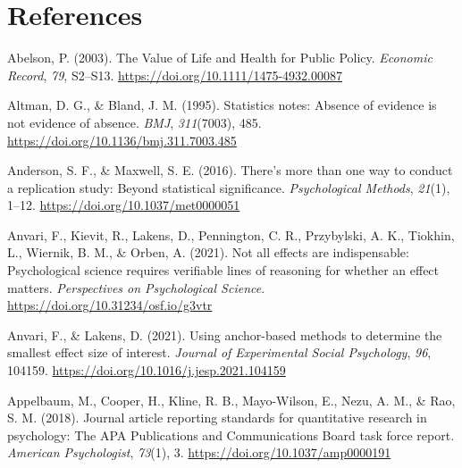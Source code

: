 \documentclass[
  letterpaper,
  DIV=11,
  numbers=noendperiod]{scrreprt}
\newlength{\cslhangindent}
\newlength{\cslentryspacingunit} %
\newenvironment{CSLReferences}[2] %
 {%
  \setlength{\parindent}{0pt}
  \ifodd #1
  \let\oldpar\par
  \def\par{\hangindent=\cslhangindent\oldpar}
  \fi
  \setlength{\parskip}{#2\cslentryspacingunit}
 }%
 {}
\begin{document}

\hypertarget{references}{%
\chapter*{References}\label{references}}


\hypertarget{refs}{}
\begin{CSLReferences}{1}{0}
\leavevmode{}%
Abelson, P. (2003). The {Value} of {Life} and {Health} for {Public
Policy}. \emph{Economic Record}, \emph{79}, S2--S13.
\url{https://doi.org/10.1111/1475-4932.00087}

\leavevmode{}%
Altman, D. G., \& Bland, J. M. (1995). Statistics notes: {Absence} of
evidence is not evidence of absence. \emph{BMJ}, \emph{311}(7003), 485.
\url{https://doi.org/10.1136/bmj.311.7003.485}

\leavevmode{}%
Anderson, S. F., \& Maxwell, S. E. (2016). There's more than one way to
conduct a replication study: {Beyond} statistical significance.
\emph{Psychological Methods}, \emph{21}(1), 1--12.
\url{https://doi.org/10.1037/met0000051}

\leavevmode{}%
Anvari, F., Kievit, R., Lakens, D., Pennington, C. R., Przybylski, A.
K., Tiokhin, L., Wiernik, B. M., \& Orben, A. (2021). Not all effects
are indispensable: {Psychological} science requires verifiable lines of
reasoning for whether an effect matters. \emph{Perspectives on
Psychological Science}. \url{https://doi.org/10.31234/osf.io/g3vtr}

\leavevmode{}%
Anvari, F., \& Lakens, D. (2021). Using anchor-based methods to
determine the smallest effect size of interest. \emph{Journal of
Experimental Social Psychology}, \emph{96}, 104159.
\url{https://doi.org/10.1016/j.jesp.2021.104159}

\leavevmode{}%
Appelbaum, M., Cooper, H., Kline, R. B., Mayo-Wilson, E., Nezu, A. M.,
\& Rao, S. M. (2018). Journal article reporting standards for
quantitative research in psychology: {The APA Publications} and
{Communications Board} task force report. \emph{American Psychologist},
\emph{73}(1), 3. \url{https://doi.org/10.1037/amp0000191}


\end{CSLReferences}
\end{document}
